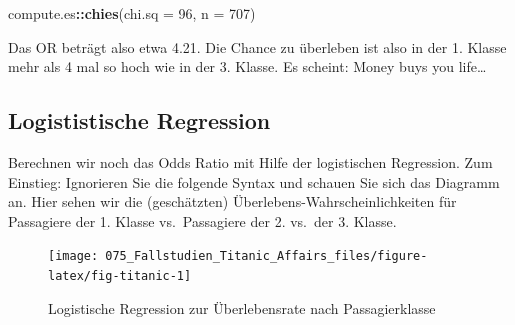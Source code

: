 \documentclass[12pt,ngerman,]{book}
\makeatletter
\newenvironment{Shaded}{\begin{snugshade}}{\end{snugshade}}
\newcommand{\KeywordTok}[1]{\textcolor[rgb]{0.13,0.29,0.53}{\textbf{#1}}}
\newcommand{\DataTypeTok}[1]{\textcolor[rgb]{0.13,0.29,0.53}{#1}}
\newcommand{\DecValTok}[1]{\textcolor[rgb]{0.00,0.00,0.81}{#1}}
\newcommand{\StringTok}[1]{\textcolor[rgb]{0.31,0.60,0.02}{#1}}
\newcommand{\CommentTok}[1]{\textcolor[rgb]{0.56,0.35,0.01}{\textit{#1}}}
\newcommand{\OperatorTok}[1]{\textcolor[rgb]{0.81,0.36,0.00}{\textbf{#1}}}
\newcommand{\NormalTok}[1]{#1}
\newenvironment{kframe}{%
\medskip{}
\setlength{\fboxsep}{.8em}
 \def\at@end@of@kframe{}%
 \ifinner\ifhmode%
  \def\at@end@of@kframe{\end{minipage}}%
  \begin{minipage}{\columnwidth}%
 \fi\fi%
 \def\FrameCommand##1{\hskip\@totalleftmargin \hskip-\fboxsep
 \colorbox{shadecolor}{##1}\hskip-\fboxsep
     \hskip-\linewidth \hskip-\@totalleftmargin \hskip\columnwidth}%
 \MakeFramed {\advance\hsize-\width
   \@totalleftmargin\z@ \linewidth\hsize
   \@setminipage}}%
 {\par\unskip\endMakeFramed%
 \at@end@of@kframe}
\renewenvironment{Shaded}{\begin{kframe}}{\end{kframe}}
\theoremstyle{definition}
\theoremstyle{definition}
\theoremstyle{remark}
\makeatother
\begin{document}
\begin{Shaded}
\begin{Highlighting}[]
\NormalTok{compute.es}\OperatorTok{::}\KeywordTok{chies}\NormalTok{(}\DataTypeTok{chi.sq =} \DecValTok{96}\NormalTok{, }\DataTypeTok{n =} \DecValTok{707}\NormalTok{) }
\end{Highlighting}
\end{Shaded}

Das OR beträgt also etwa 4.21. Die Chance zu überleben ist also in der
1. Klasse mehr als 4 mal so hoch wie in der 3. Klasse. Es scheint: Money
buys you life\ldots{}

\subsection{Logististische Regression}\label{logististische-regression}

Berechnen wir noch das Odds Ratio mit Hilfe der logistischen Regression.
Zum Einstieg: Ignorieren Sie die folgende Syntax und schauen Sie sich
das Diagramm an. Hier sehen wir die (geschätzten)
Überlebens-Wahrscheinlichkeiten für Passagiere der 1. Klasse
vs.~Passagiere der 2. vs.~der 3. Klasse.

\begin{Shaded}
\end{Shaded}

\begin{figure}

{\centering \texttt{[image: 075\_Fallstudien\_Titanic\_Affairs\_files/figure-latex/fig-titanic-1]} 

}

\caption{Logistische Regression zur Überlebensrate nach Passagierklasse}\label{fig:fig-titanic}
\end{figure}
\end{document}
